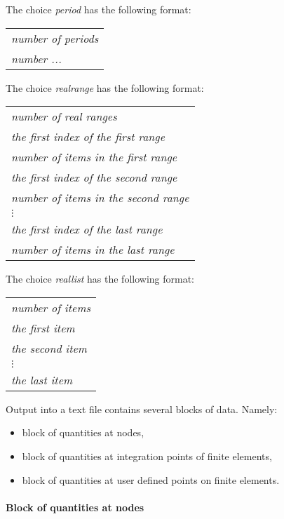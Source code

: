 The choice {\it period} has the following format:

\begin{tabular}{l}
{\it number of periods}
\\
{\it number ...}
\\
\end{tabular}


The choice {\it realrange} has the following format:

\begin{tabular}{l}
{\it number of real ranges}
\\
{\it the first index of the first range}
\\
{\it number of items in the first range}
\\
{\it the first index of the second range}
\\
{\it number of items in the second range}
\\
$\vdots$
\\
{\it the first index of the last range}
\\
{\it number of items in the last range}
\\
\end{tabular}


The choice {\it reallist} has the following format:

\begin{tabular}{l}
{\it number of items}
\\
{\it the first item}
\\
{\it the second item}
\\
$\vdots$
\\
{\it the last item}
\\
\end{tabular}



Output into a text file contains several blocks of data. Namely:
\begin{itemize}
\item block of quantities at nodes,
\item block of quantities at integration points of finite elements,
\item block of quantities at user defined points on finite elements.
\end{itemize}

\paragraph{}{\bf Block of quantities at nodes}

